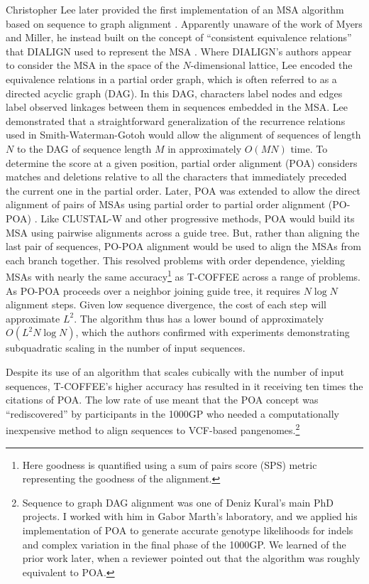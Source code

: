 Christopher Lee later provided the first implementation of an MSA algorithm based on sequence to graph alignment \cite{lee2002POA}.
Apparently unaware of the work of Myers and Miller, he instead built on the concept of ``consistent equivalence relations'' that DIALIGN used to represent the MSA \cite{morgenstern1996multiple}.
Where DIALIGN's authors appear to consider the MSA in the space of the $N$-dimensional lattice, Lee encoded the equivalence relations in a partial order graph, which is often referred to as a directed acyclic graph (DAG).
In this DAG, characters label nodes and edges label observed linkages between them in sequences embedded in the MSA.
Lee demonstrated that a straightforward generalization of the recurrence relations used in Smith-Waterman-Gotoh would allow the alignment of sequences of length $N$ to the DAG of sequence length $M$ in approximately $O(MN)$ time.
To determine the score at a given position, partial order alignment (POA) considers matches and deletions relative to all the characters that immediately preceded the current one in the partial order.
Later, POA was extended to allow the direct alignment of pairs of MSAs using partial order to partial order alignment (PO-POA) \cite{grasso2004combining}.
Like CLUSTAL-W and other progressive methods, POA would build its MSA using pairwise alignments across a guide tree.
But, rather than aligning the last pair of sequences, PO-POA alignment would be used to align the MSAs from each branch together.
This resolved problems with order dependence, yielding MSAs with nearly the same accuracy\footnote{Here goodness is quantified using a sum of pairs score (SPS) metric representing the goodness of the alignment.} as T-COFFEE across a range of problems.
As PO-POA proceeds over a neighbor joining guide tree, it requires $N \log{N}$ alignment steps.
Given low sequence divergence, the cost of each step will approximate $L^2$.
The algorithm thus has a lower bound of approximately $O(L^{2}N\log{N})$, which the authors confirmed with experiments demonstrating subquadratic scaling in the number of input sequences.

Despite its use of an algorithm that scales cubically with the number of input sequences, T-COFFEE's higher accuracy has resulted in it receiving ten times the citations of POA.
The low rate of use meant that the POA concept was ``rediscovered'' by participants in the 1000GP who needed a computationally inexpensive method to align sequences to VCF-based pangenomes.\footnote{Sequence to graph DAG alignment was one of Deniz Kural's main PhD projects. I worked with him in Gabor Marth's laboratory, and we applied his implementation of POA to generate accurate genotype likelihoods for indels and complex variation in the final phase of the 1000GP. We learned of the prior work later, when a reviewer pointed out that the algorithm was roughly equivalent to POA.}

